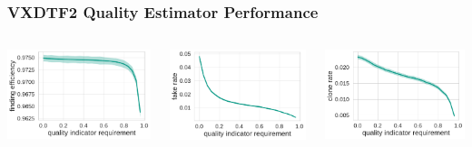 \documentclass[18pt, aspectratio=169]{beamer}
\begin{document}
\begin{frame}
  \frametitle{VXDTF2 Quality Estimator Performance}
  \begin{columns}
    \begin{column}{.33\textwidth}
      \centering
      \includegraphics[width=\textwidth]{figures/vxd-qi/findeff.pdf}\\
    \end{column}
    \begin{column}{.33\textwidth}
      \centering
            \includegraphics[width=\textwidth]{figures/vxd-qi/fake_rate.pdf}\\
    \end{column}
    \begin{column}{.33\textwidth}
      \centering
      \includegraphics[width=\textwidth]{figures/vxd-qi/clone_rate.pdf}

\end{column}
\end{columns}
\end{frame}
\end{document}
